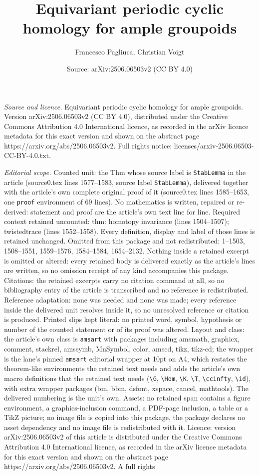 \documentclass[10pt,a4paper]{amsart}
\title[Equivariant periodic cyclic homology for ample groupoids]{Equivariant periodic cyclic homology for ample groupoids}
\author{Francesco Pagliuca, Christian Voigt}
\date{Source: arXiv:2506.06503v2 (CC BY 4.0)}
\begin{document}
\maketitle

\noindent\emph{Source and licence.} Equivariant periodic cyclic homology for ample groupoids. Version arXiv:2506.06503v2 (CC BY 4.0), distributed under the Creative Commons Attribution 4.0 International licence, as recorded in the arXiv licence metadata for this exact version and shown on the abstract page https://arxiv.org/abs/2506.06503v2. Full rights notice: licenses/arxiv-2506.06503-CC-BY-4.0.txt.\par\smallskip

\noindent\textit{Editorial scope.} Counted unit: the Thm whose source label is \texttt{StabLemma} in the article (source0.tex lines 1577--1583, source label \texttt{StabLemma}), delivered together with the article's own complete original proof of it (source0.tex lines 1585--1653, one \texttt{proof} environment of 69 lines). No mathematics is written, repaired or re-derived: statement and proof are the article's own text line for line. Required context retained uncounted: thm: homotopy invariance (lines 1504--1507); twistedtrace (lines 1552--1558). Every definition, display and label of those lines is retained unchanged. Omitted from this package and not redistributed: 1--1503, 1508--1551, 1559--1576, 1584--1584, 1654--2132. Nothing inside a retained excerpt is omitted or altered: every retained body is delivered exactly as the article's lines are written, so no omission receipt of any kind accompanies this package. Citations: the retained excerpts carry no citation command at all, so no bibliography entry of the article is transcribed and no reference is redistributed. Reference adaptation: none was needed and none was made; every reference inside the delivered unit resolves inside it, so no unresolved reference or citation is produced. Printed slips kept literal: no printed word, symbol, hypothesis or number of the counted statement or of its proof was altered. Layout and class: the article's own class is \texttt{amsart} with packages including amsmath, graphicx, comment, stackrel, amssymb, MnSymbol, color, amscd, tikz, tikz-cd; the wrapper is the lane's pinned \texttt{amsart} editorial wrapper at 10pt on A4, which restates the theorem-like environments the retained text needs and adds the article's own macro definitions that the retained text needs (\texttt{\textbackslash G}, \texttt{\textbackslash Hom}, \texttt{\textbackslash K}, \texttt{\textbackslash T}, \texttt{\textbackslash ccinfty}, \texttt{\textbackslash id}), with extra wrapper packages (bm, bbm, dsfont, xspace, cancel, mathtools). The delivered numbering is the unit's own. Assets: no retained span contains a figure environment, a graphics-inclusion command, a PDF-page inclusion, a table or a TikZ picture; no image file is copied into this package, the package declares no asset dependency and no image file is redistributed with it. Licence: version arXiv:2506.06503v2 of this article is distributed under the Creative Commons Attribution 4.0 International licence, as recorded in the arXiv licence metadata for this exact version and shown on the abstract page https://arxiv.org/abs/2506.06503v2. A full rights 
\end{document}
